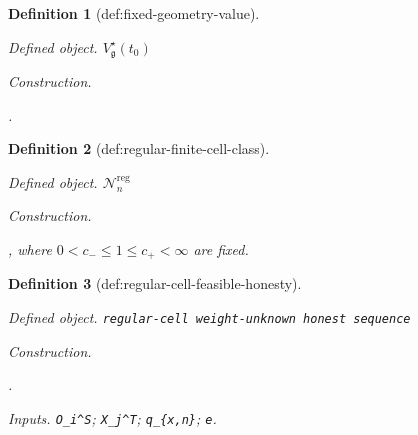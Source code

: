 \documentclass{article}
\newtheorem{definition}{Definition}
\begin{document}
\begin{definition}[def:fixed-geometry-value]\label{def:fixed-geometry-value}
\par\smallskip\noindent\emph{Defined object.} \(V_{\mathfrak g}^\star(t_0)\)
\par\smallskip\noindent\emph{Construction.} \par\noindent {}\par\noindent.
\end{definition}

\begin{definition}[def:regular-finite-cell-class]\label{def:regular-finite-cell-class}
\par\smallskip\noindent\emph{Defined object.} \(\mathcal N_n^{\mathrm{reg}}\)
\par\smallskip\noindent\emph{Construction.} \par\noindent {}\par\noindent, where \(0<c_-\le1\le c_+<\infty\) are fixed.
\end{definition}

\begin{definition}[def:regular-cell-feasible-honesty]\label{def:regular-cell-feasible-honesty}
\par\smallskip\noindent\emph{Defined object.} \texttt{regular-\allowbreak{}cell weight-\allowbreak{}unknown honest sequence}
\par\smallskip\noindent\emph{Construction.} \par\noindent {}\par\noindent.
\par\smallskip\noindent\emph{Inputs.} \texttt{O\_\allowbreak{}i\textasciicircum{}S}; \texttt{X\_\allowbreak{}j\textasciicircum{}T}; \texttt{q\_\allowbreak{}\{x,\allowbreak{}n\}\allowbreak{}}; \texttt{e}.
\end{definition}
\end{document}
